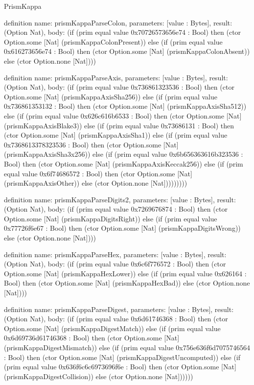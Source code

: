 \begin{lexlean}{PrismKappa}
\begin{semanticmodule}
definition{
  name: prismKappaParseColon,
  parameters: [value : Bytes],
  result: (Option Nat),
  body: (if (prim equal value 0x70726573656e74 : Bool) then (ctor Option.some [Nat] (prismKappaColonPresent)) else (if (prim equal value 0x616273656e74 : Bool) then (ctor Option.some [Nat] (prismKappaColonAbsent)) else (ctor Option.none [Nat])))
}

definition{
  name: prismKappaParseAxis,
  parameters: [value : Bytes],
  result: (Option Nat),
  body: (if (prim equal value 0x736861323536 : Bool) then (ctor Option.some [Nat] (prismKappaAxisSha256)) else (if (prim equal value 0x736861353132 : Bool) then (ctor Option.some [Nat] (prismKappaAxisSha512)) else (if (prim equal value 0x626c616b6533 : Bool) then (ctor Option.some [Nat] (prismKappaAxisBlake3)) else (if (prim equal value 0x73686131 : Bool) then (ctor Option.some [Nat] (prismKappaAxisSha1)) else (if (prim equal value 0x7368613378323536 : Bool) then (ctor Option.some [Nat] (prismKappaAxisSha3x256)) else (if (prim equal value 0x6b656363616b323536 : Bool) then (ctor Option.some [Nat] (prismKappaAxisKeccak256)) else (if (prim equal value 0x6f74686572 : Bool) then (ctor Option.some [Nat] (prismKappaAxisOther)) else (ctor Option.none [Nat]))))))))
}

definition{
  name: prismKappaParseDigits2,
  parameters: [value : Bytes],
  result: (Option Nat),
  body: (if (prim equal value 0x7269676874 : Bool) then (ctor Option.some [Nat] (prismKappaDigitsRight)) else (if (prim equal value 0x77726f6e67 : Bool) then (ctor Option.some [Nat] (prismKappaDigitsWrong)) else (ctor Option.none [Nat])))
}

definition{
  name: prismKappaParseHex,
  parameters: [value : Bytes],
  result: (Option Nat),
  body: (if (prim equal value 0x6c6f776572 : Bool) then (ctor Option.some [Nat] (prismKappaHexLower)) else (if (prim equal value 0x626164 : Bool) then (ctor Option.some [Nat] (prismKappaHexBad)) else (ctor Option.none [Nat])))
}

definition{
  name: prismKappaParseDigest,
  parameters: [value : Bytes],
  result: (Option Nat),
  body: (if (prim equal value 0x6d61746368 : Bool) then (ctor Option.some [Nat] (prismKappaDigestMatch)) else (if (prim equal value 0x6d69736d61746368 : Bool) then (ctor Option.some [Nat] (prismKappaDigestMismatch)) else (if (prim equal value 0x756e636f6d7075746564 : Bool) then (ctor Option.some [Nat] (prismKappaDigestUncomputed)) else (if (prim equal value 0x636f6c6c6973696f6e : Bool) then (ctor Option.some [Nat] (prismKappaDigestCollision)) else (ctor Option.none [Nat])))))
}


\end{semanticmodule}
\end{lexlean}

